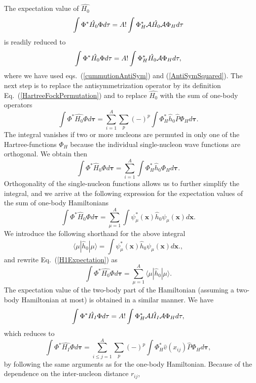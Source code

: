 The expectation value of $\hat{H_0}$
\[
  \int \Phi^*\hat{H_0}\Phi d\mathbf{\tau} = A! \int \Phi_H^*{\cal
    A}\hat{H_0}{\cal A}\Phi_H d\mathbf{\tau}
\]
is readily reduced to
\[
  \int \Phi^*\hat{H_0}\Phi d\mathbf{\tau} = A! \int
  \Phi_H^*\hat{H_0}{\cal A}\Phi_H d\mathbf{\tau},
\]
where we have used eqs.~(\ref{cummutionAntiSym}) and
(\ref{AntiSymSquared}). The next step is to replace the
antisymmetrization operator by its definition
Eq.~(\ref{HartreeFockPermutation}) and to replace $\hat{H_0}$ with the
sum of one-body operators
\[
  \int \Phi^*\hat{H_0}\Phi d\mathbf{\tau} = \sum_{i=1}^A \sum_{p}
  (-)^p\int \Phi_H^*\hat{h}_0\hat{P}\Phi_H d\mathbf{\tau}.
\]
The integral vanishes if two or more nucleons are permuted in only one
of the Hartree-functions $\Phi_H$ because the individual
single-nucleon wave functions are orthogonal. We obtain then
\[
  \int \Phi^*\hat{H}_0\Phi d\mathbf{\tau}= \sum_{i=1}^A \int
  \Phi_H^*\hat{h}_0\Phi_H d\mathbf{\tau}.
\]
Orthogonality of the single-nucleon functions allows us to further
simplify the integral, and we arrive at the following expression for
the expectation values of the sum of one-body Hamiltonians
\begin{equation}
  \int \Phi^*\hat{H}_0\Phi d\mathbf{\tau} = \sum_{\mu=1}^A \int
  \psi_{\mu}^*(\mathbf{x})\hat{h}_0\psi_{\mu}(\mathbf{x}) d\mathbf{x}.
  \label{H1Expectation}
\end{equation}
We introduce the following shorthand for the above integral
\[
\langle \mu | \hat{h}_0 | \mu \rangle = \int
\psi_{\mu}^*(\mathbf{x})\hat{h}_0\psi_{\mu}(\mathbf{x})d\mathbf{x}.,
\]
and rewrite Eq.~(\ref{H1Expectation}) as
\begin{equation}
  \int \Phi^*\hat{H_0}\Phi d\mathbf{\tau} = \sum_{\mu=1}^A \langle \mu
  | \hat{h}_0 | \mu \rangle.
  \label{H1Expectation1}
\end{equation}
The expectation value of the two-body part of the Hamiltonian
(assuming a two-body Hamiltonian at most) is obtained in a similar
manner. We have
\begin{equation*}
  \int \Phi^*\hat{H_I}\Phi d\mathbf{\tau} = A! \int \Phi_H^*{\cal
    A}\hat{H_I}{\cal A}\Phi_H d\mathbf{\tau},
\end{equation*}
which reduces to
\begin{equation*}
 \int \Phi^*\hat{H_I}\Phi d\mathbf{\tau} = \sum_{i\le j=1}^A \sum_{p}
 (-)^p\int \Phi_H^*\hat{v}(x_{ij})\hat{P}\Phi_H d\mathbf{\tau},
\end{equation*}
by following the same arguments as for the one-body Hamiltonian.
Because of the dependence on the inter-nucleon distance $r_{ij}$,
